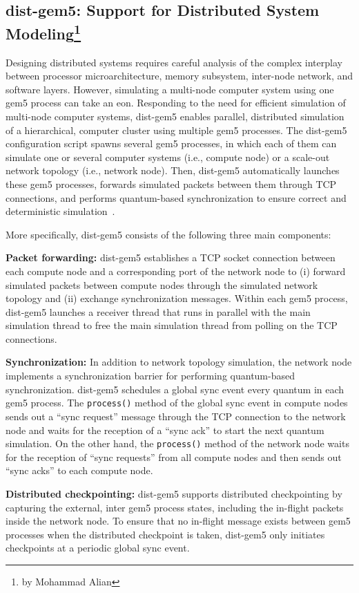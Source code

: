 \subsection[dist-gem5: Support for Distributed System Modeling]{dist-gem5: Support for Distributed System Modeling\footnote{by Mohammad Alian}}
\label{sec:dist-gem5}

Designing distributed systems requires careful analysis of the complex interplay between processor
microarchitecture, memory subsystem, inter-node network, and software layers.
However, simulating a multi-node computer system using one gem5 process can take an eon.
Responding to the need for efficient simulation of multi-node computer systems, dist-gem5 enables parallel, distributed simulation of a hierarchical, computer cluster using multiple gem5 processes.
The dist-gem5 configuration script spawns several gem5 processes, in which each of them can simulate one or several computer systems (i.e., compute node) or a scale-out network topology (i.e., network node).
Then, dist-gem5 automatically launches these gem5 processes, forwards simulated packets between them through TCP connections, and performs quantum-based synchronization to ensure correct and deterministic simulation~\cite{AlianDarbaz2016-gem5Dist, AlianKim2016-pd-gem5}.

More specifically, dist-gem5 consists of the following three main components:

\textbf{Packet forwarding:} dist-gem5 establishes a TCP socket connection between each compute node and a corresponding port of the network node to (i) forward simulated packets between compute nodes
through the simulated network topology and (ii) exchange synchronization messages.
Within each gem5 process, dist-gem5 launches a receiver thread that runs in parallel with the main simulation thread to free the main simulation thread from polling on the TCP connections.

\textbf{Synchronization:} In addition to network topology simulation, the network node implements a
synchronization barrier for performing quantum-based synchronization.
dist-gem5 schedules a global
sync event every quantum in each gem5 process.
The \verb|process()| method of the global sync event in
compute nodes sends out a ``sync request'' message through the TCP connection to the network node
and waits for the reception of a ``sync ack'' to start the next quantum simulation.
On the other hand, the \verb|process()| method of the network node waits for the reception of ``sync requests'' from all compute nodes and then sends out ``sync acks'' to each compute node.

\textbf{Distributed checkpointing:} dist-gem5 supports distributed checkpointing by capturing the external, inter gem5 process states, including the in-flight packets inside the network node.
To ensure that no in-flight message exists between gem5 processes when the distributed checkpoint is taken, dist-gem5 only initiates checkpoints at a periodic global sync event.


